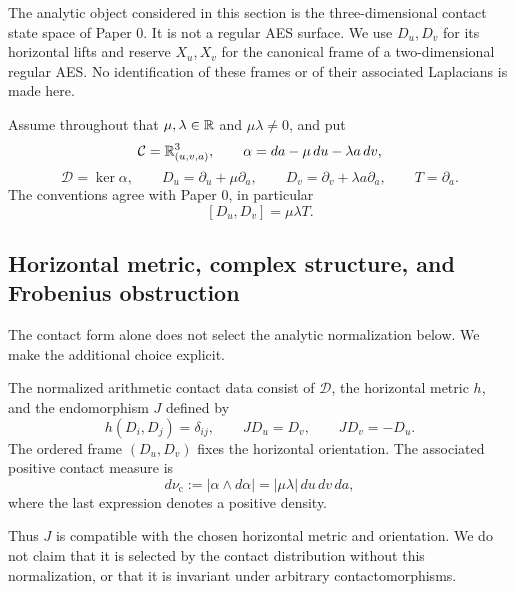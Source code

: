 The analytic object considered in this section is the three-dimensional contact
state space of Paper 0.  It is not a regular AES surface.  We use $D_u,D_v$ for
its horizontal lifts and reserve $X_u,X_v$ for the canonical frame of a
two-dimensional regular AES.  No identification of these frames or of their
associated Laplacians is made here.

Assume throughout that $\mu,\lambda\in\mathbb{R}$ and $\mu\lambda\ne0$, and put
\[
 \mathcal C=\mathbb{R}^3_{(u,v,a)},\qquad
 \alpha=da-\mu\,du-\lambda a\,dv,
\]
\begin{equation}\label{eq:contact-horizontal-data}
 \mathcal D=\ker\alpha,\qquad
 D_u=\partial_u+\mu\partial_a,\qquad
 D_v=\partial_v+\lambda a\partial_a,\qquad T=\partial_a.
\end{equation}
The conventions agree with Paper 0, in particular
\begin{equation}\label{eq:contact-bracket-import}
 [D_u,D_v]=\mu\lambda T.
\end{equation}

\subsection{Horizontal metric, complex structure, and Frobenius obstruction}

The contact form alone does not select the analytic normalization below.  We make
the additional choice explicit.

\begin{definition}
\label{def:normalized-contact-analytic-data}
The normalized arithmetic contact data consist of $\mathcal D$, the horizontal
metric $h$, and the endomorphism $J$ defined by
\begin{equation}\label{eq:contact-h-and-J}
 h(D_i,D_j)=\delta_{ij},\qquad JD_u=D_v,\qquad JD_v=-D_u.
\end{equation}
The ordered frame $(D_u,D_v)$ fixes the horizontal orientation.  The associated
positive contact measure is
\begin{equation}\label{eq:positive-contact-measure}
 d\nu_{\mathrm c}:=|\alpha\wedge d\alpha|
 =|\mu\lambda|\,du\,dv\,da,
\end{equation}
where the last expression denotes a positive density.
\end{definition}

Thus $J$ is compatible with the chosen horizontal metric and orientation.  We do
not claim that it is selected by the contact distribution without this
normalization, or that it is invariant under arbitrary contactomorphisms.

